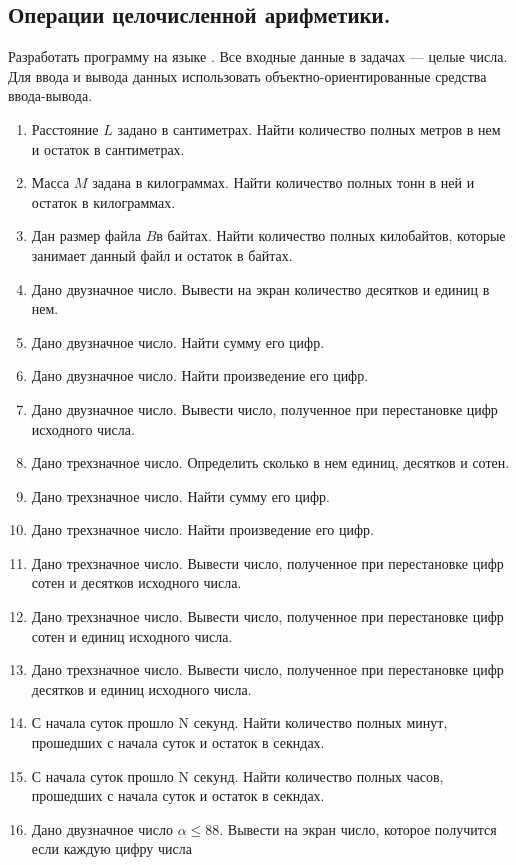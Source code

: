 \subsection[Операции целочисленной арифметики.]{Операции целочисленной арифметики.}
Разработать программу на языке . Все входные данные в задачах --- {целые числа}. Для ввода и вывода
данных использовать объектно-ориентированные средства ввода-вывода.

\begin{enumerate}
\item Расстояние $L$ задано в сантиметрах. Найти количество полных метров в нем и остаток в
сантиметрах.
\item Масса $M$ задана в килограммах. Найти количество полных тонн в ней и остаток в килограммах.
\item Дан размер файла $B$в байтах. Найти количество полных килобайтов, которые занимает данный файл
и остаток в байтах.
\item Дано двузначное число. Вывести на экран количество десятков и единиц в нем.
\item Дано двузначное число. Найти сумму его цифр.
\item Дано двузначное число. Найти произведение его цифр.
\item Дано двузначное число. Вывести число, полученное при перестановке цифр исходного числа.
\item Дано трехзначное число. Определить сколько в нем единиц, десятков и сотен.
\item Дано трехзначное число. Найти сумму его цифр.
\item Дано трехзначное число. Найти произведение его цифр.
\item Дано трехзначное число. Вывести число, полученное при перестановке цифр сотен и десятков исходного числа.
\item Дано трехзначное число. Вывести число, полученное при перестановке цифр сотен и единиц исходного числа.
\item Дано трехзначное число. Вывести число, полученное при перестановке цифр десятков и единиц исходного числа.
\item С начала суток прошло N секунд. Найти количество полных минут, прошедших с начала суток и остаток в секндах.
\item С начала суток прошло N секунд. Найти количество полных часов, прошедших с начала суток и остаток в секндах.
\item Дано двузначное число $\alpha\le 88$. Вывести на экран число, которое получится если каждую цифру числа

\end{enumerate}
